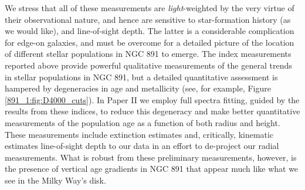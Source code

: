 
We stress that all of these measurements are {\it light}-weighted by
the very virtue of their observational nature, and hence are sensitive
to star-formation history (as we would like), and line-of-sight
depth. The latter is a considerable complication for edge-on galaxies,
and must be overcome for a detailed picture of the location of
different stellar populations in NGC 891 to emerge. The index
measurements reported above provide powerful qualitative measurements
of the general trends in stellar populations in NGC 891, but a
detailed quantitative assessment is hampered by degeneracies in age
and metallicity (see, for example, Figure \ref{891_1:fig:D4000_cuts}).
In Paper II we employ full spectra fitting, guided by the results from
these indices, to reduce this degeneracy and make better quantitative
measurements of the population age as a function of both radius and
height. These measurements include extinction estimates and,
critically, kinematic estimates line-of-sight depth to our data in an
effort to de-project our radial measurements. What is robust from
these preliminary measurements, however, is the presence of vertical
age gradients in NGC 891 that appear much like what we see in the
Milky Way's disk.


